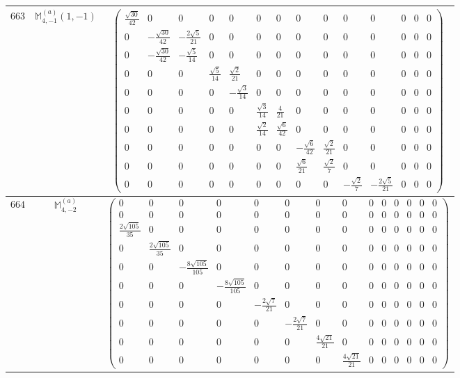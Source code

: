 \documentclass[fleqn,8pt,landscape]{jsarticle}
\begin{document}
\begin{center}
\begin{longtable}{ccc}
$ 663 $ & $ \mathbb{M}_{4,-1}^{(a)}(1,-1) $ & $ \begin{pmatrix} \frac{\sqrt{30}}{42} & 0 & 0 & 0 & 0 & 0 & 0 & 0 & 0 & 0 & 0 & 0 & 0 & 0 \\ 0 & - \frac{\sqrt{30}}{42} & - \frac{2 \sqrt{5}}{21} & 0 & 0 & 0 & 0 & 0 & 0 & 0 & 0 & 0 & 0 & 0 \\ 0 & - \frac{\sqrt{30}}{42} & - \frac{\sqrt{5}}{14} & 0 & 0 & 0 & 0 & 0 & 0 & 0 & 0 & 0 & 0 & 0 \\ 0 & 0 & 0 & \frac{\sqrt{5}}{14} & \frac{\sqrt{2}}{21} & 0 & 0 & 0 & 0 & 0 & 0 & 0 & 0 & 0 \\ 0 & 0 & 0 & 0 & - \frac{\sqrt{3}}{14} & 0 & 0 & 0 & 0 & 0 & 0 & 0 & 0 & 0 \\ 0 & 0 & 0 & 0 & 0 & \frac{\sqrt{3}}{14} & \frac{4}{21} & 0 & 0 & 0 & 0 & 0 & 0 & 0 \\ 0 & 0 & 0 & 0 & 0 & \frac{\sqrt{2}}{14} & \frac{\sqrt{6}}{42} & 0 & 0 & 0 & 0 & 0 & 0 & 0 \\ 0 & 0 & 0 & 0 & 0 & 0 & 0 & - \frac{\sqrt{6}}{42} & \frac{\sqrt{2}}{21} & 0 & 0 & 0 & 0 & 0 \\ 0 & 0 & 0 & 0 & 0 & 0 & 0 & \frac{\sqrt{6}}{21} & \frac{\sqrt{2}}{7} & 0 & 0 & 0 & 0 & 0 \\ 0 & 0 & 0 & 0 & 0 & 0 & 0 & 0 & 0 & - \frac{\sqrt{2}}{7} & - \frac{2 \sqrt{5}}{21} & 0 & 0 & 0 \end{pmatrix} $ \\ \hline
$ 664 $ & $ \mathbb{M}_{4,-2}^{(a)} $ & $ \begin{pmatrix} 0 & 0 & 0 & 0 & 0 & 0 & 0 & 0 & 0 & 0 & 0 & 0 & 0 & 0 \\ 0 & 0 & 0 & 0 & 0 & 0 & 0 & 0 & 0 & 0 & 0 & 0 & 0 & 0 \\ \frac{2 \sqrt{105}}{35} & 0 & 0 & 0 & 0 & 0 & 0 & 0 & 0 & 0 & 0 & 0 & 0 & 0 \\ 0 & \frac{2 \sqrt{105}}{35} & 0 & 0 & 0 & 0 & 0 & 0 & 0 & 0 & 0 & 0 & 0 & 0 \\ 0 & 0 & - \frac{8 \sqrt{105}}{105} & 0 & 0 & 0 & 0 & 0 & 0 & 0 & 0 & 0 & 0 & 0 \\ 0 & 0 & 0 & - \frac{8 \sqrt{105}}{105} & 0 & 0 & 0 & 0 & 0 & 0 & 0 & 0 & 0 & 0 \\ 0 & 0 & 0 & 0 & - \frac{2 \sqrt{7}}{21} & 0 & 0 & 0 & 0 & 0 & 0 & 0 & 0 & 0 \\ 0 & 0 & 0 & 0 & 0 & - \frac{2 \sqrt{7}}{21} & 0 & 0 & 0 & 0 & 0 & 0 & 0 & 0 \\ 0 & 0 & 0 & 0 & 0 & 0 & \frac{4 \sqrt{21}}{21} & 0 & 0 & 0 & 0 & 0 & 0 & 0 \\ 0 & 0 & 0 & 0 & 0 & 0 & 0 & \frac{4 \sqrt{21}}{21} & 0 & 0 & 0 & 0 & 0 & 0 \end{pmatrix} $ \\ \hline

\end{longtable}
\end{center}
\end{document}
